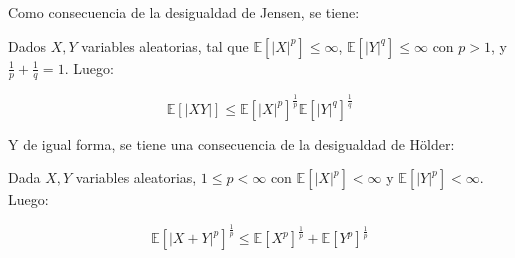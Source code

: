 Como consecuencia de la desigualdad de Jensen, se tiene:

\begin{theorem}
	Dados $X, Y$ variables aleatorias, tal que $\mathbb{E}[ \lvert X \rvert^p ] \leq \infty$, $\mathbb{E}[ \lvert Y \rvert^q ] \leq \infty$ con $p > 1$, y $\frac{1}{p} + \frac{1}{q} = 1$. Luego:

	\[
		\mathbb{E}[ \lvert XY \rvert ] \leq \mathbb{E}[ \lvert X \rvert^p ]^{\frac{1}{p}} \mathbb{E}[ \lvert Y \rvert^q ]^{\frac{1}{q}}
	\]
\end{theorem}

Y de igual forma, se tiene una consecuencia de la desigualdad de Hölder:

\begin{theorem}
	Dada $X, Y$ variables aleatorias, $1 \leq p < \infty$ con $\mathbb{E}[ \lvert X \rvert^p ] < \infty$ y $\mathbb{E}[ \lvert Y \rvert^p ] < \infty$. Luego:

	\[
		\mathbb{E}[ \lvert X + Y \rvert^p ]^{ \frac{1}{p} } \leq \mathbb{E}[X^p]^{\frac{1}{p}} + \mathbb{E}[Y^p]^{\frac{1}{p}}
	\]
\end{theorem}








































